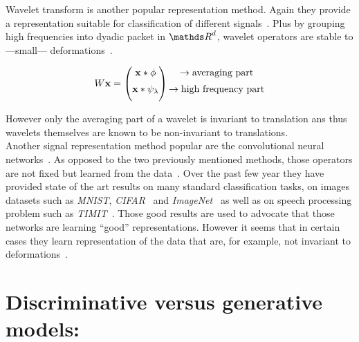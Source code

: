 \documentclass[a4paper,11pt]{report}
\begin{document}
			Wavelet transform is another popular representation method. Again they provide a representation suitable for classification of different signals~\citep{de2000using}. Plus by grouping high frequencies into dyadic packet in $\dsR^{d}$, wavelet operators are stable to ---small--- deformations~\citep{bruna2013invariant}.  %
			
			\begin{equation}
				\begin{matrix}
					W{\bf x} =
					\begin{pmatrix}
						{\bf x} \ast \phi \\[0.5em]
						{\bf x} \ast \psi_{\lambda} \\[0.5em]
					\end{pmatrix}
					\begin{aligned}
						\begin{matrix}
							\rightarrow \text{averaging part}				\\[0.5em]
							\rightarrow \text{high frequency part}	\\[0.5em]
						\end{matrix}
					\end{aligned}
				\end{matrix}
			\end{equation}
		

			However only the averaging part of a wavelet is invariant to translation ans thus wavelets themselves are known to be non-invariant to translations.\\
			
			Another signal representation method popular are the convolutional neural networks~\citep{lecun1995convolutional}. As opposed to the two previously mentioned methods, those operators are not fixed but learned from the data~\citep{simard2003best}. Over the past few year they have provided state of the art results on many standard classification tasks, on images datasets such as \textit{MNIST}, \textit{CIFAR}~\citep{hinton2012improving} and \textit{ImageNet}~\citep{krizhevsky2012imagenet} as well as on speech processing problem such as \textit{TIMIT}~\citep{abdel2012applying}. Those good results are used to advocate that those networks are learning ``good'' representations. However it seems that in certain cases they learn representation of the data that are, for example, not invariant to deformations~\citep{szegedy2013intriguing}.\\
			         
	\section{Discriminative versus generative models:}
		\label{sec:Intro/Discr vs gen}
		
\end{document}
